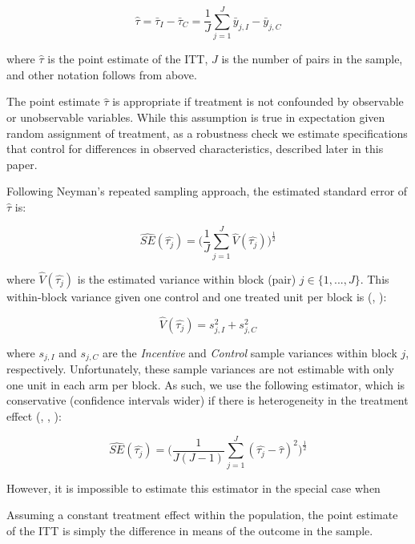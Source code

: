 \documentclass[12pt]{article}
\begin{document}
\begin{equation} \label{itt_spec}
	\hat{\tau} = \bar{\tau}_I - \bar{\tau}_C = \frac{1}{J}\sum_{j=1}^{J} \bar{y}_{j,I} - \bar{y}_{j,C}
\end{equation}

where $\hat{\tau}$ is the point estimate of the ITT, $J$ is the number of pairs in the sample, and other notation follows from above.

The point estimate $\hat{\tau}$ is appropriate if treatment is not confounded by observable or unobservable variables. While this assumption is true in expectation given random assignment of treatment, as a robustness check we estimate specifications that control for differences in observed characteristics, described later in this paper.

Following Neyman's repeated sampling approach, the estimated standard error of $\hat{\tau}$ \citep{imai2008, ir2015, ai2017} is:

\begin{equation} \label{se_block}
	\hat{SE}(\hat{\tau_j}) = \Big(\frac{1}{J}\sum_{j=1}^{J} \hat{V}(\hat{\tau_j}) \Big)^\frac{1}{2}
\end{equation}

where $\hat{V}(\hat{\tau_j})$ is the estimated variance within block (pair) $j\in \{1,...,J\}$. This within-block variance given one control and one treated unit per block is (\cite{ir2015}, \cite{ai2017}):

\begin{equation} \label{v_block}
	\hat{V}(\hat{\tau_j}) = s_{j, I}^2 + s_{j, C}^2
\end{equation}

where $s_{j, I}$ and $s_{j, C}$ are the \textit{Incentive} and \textit{Control} sample variances within block $j$, respectively. Unfortunately, these sample variances are not estimable with only one unit in each arm per block. As such, we use the following estimator, which is conservative (confidence intervals wider) if there is heterogeneity in the treatment effect (\cite{imai2008}, \cite{ai2015}, \cite{ai2017}):

\begin{equation} \label{se_imai}
	\hat{SE}(\hat{\tau_j}) = \Big(\frac{1}{J(J-1)}\sum_{j=1}^{J} (\hat{\tau_j} - \hat{\tau})^2 \Big)^\frac{1}{2}
\end{equation}

However, it is impossible to estimate this estimator in the special case when

Assuming a constant treatment effect within the population, the point estimate of the ITT is simply the difference in means of the outcome in the sample.
\end{document}
